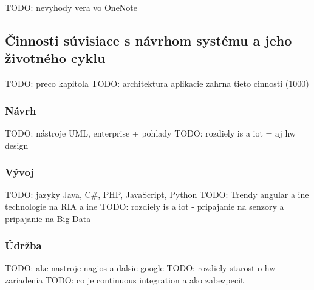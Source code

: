 TODO: nevyhody vera vo OneNote

\subsection{Činnosti súvisiace s návrhom systému a jeho životného cyklu}
TODO: preco kapitola 
TODO: architektura aplikacie zahrna tieto cinnosti (1000)
\subsubsection{Návrh}
TODO: nástroje UML, enterprise + pohlady
TODO: rozdiely is a iot = aj hw design 
\subsubsection{Vývoj}
TODO: jazyky Java, C\#, PHP, JavaScript, Python
TODO: Trendy angular a ine technologie na RIA a ine 
TODO: rozdiely is a iot - pripajanie na senzory a pripajanie na Big Data
\subsubsection{Údržba}
TODO: ake nastroje nagios a dalsie google
TODO: rozdiely starost o hw zariadenia
TODO: co je continuous integration a ako zabezpecit
